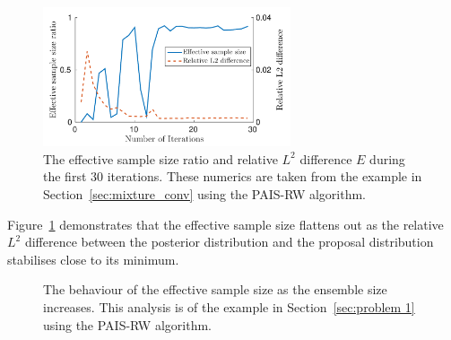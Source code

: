 \documentclass[final]{siamltex}
\begin{document}
\begin{figure}[htb]
\centering
\includegraphics[width=0.65\textwidth]{"figures/C1_burnin"}
\caption{The effective sample size ratio and relative $L^2$ difference
$E$ during the first 30 iterations. These numerics are taken from the
example in Section~\ref{sec:mixture_conv} using the PAIS-RW algorithm.}
\label{fig:neff-burnin}
\end{figure}

Figure~\ref{fig:neff-burnin} demonstrates that the effective sample
size flattens out as the relative $L^2$ difference between the
posterior distribution and the proposal distribution stabilises close
to its minimum.

\begin{figure}[htb]
\centering
{}
\caption{The behaviour of the effective sample size as the ensemble size increases. This analysis is of the example in Section~\ref{sec:problem 1} using the PAIS-RW algorithm.}
\label{fig:neff-M}
\end{figure}
\end{document}
